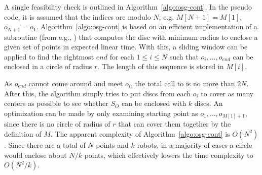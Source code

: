 A single feasibility check is outlined in Algorithm~\ref{algo:osg-cont}.
In the pseudo code, it is assumed that the indices are modulo $N$, e.g. 
$M[N+1] = M[1]$, $o_{N+1} = o_1$. 
%
Algorithm~\ref{algo:osg-cont} is based on an efficient implementation of 
a subroutine \algomed (from e.g., \cite{welzl1991smallest,
Mark1997computation}) that computes the disc with minimum radius to 
enclose a given set of points in expected linear time. With this, a sliding 
window can be applied to find the rightmost $end$ for each $1\leq i\leq 
N$ such that $o_i, \dots, o_{end}$ can be enclosed in a circle of radius 
$r$. The length of this sequence is stored in $M[i]$. 

As $o_{end}$ cannot come around and meet $o_i$, the total call to 
\algomed is no more than $2N$. After this, the algorithm simply tries to put 
discs from each $o_i$ to cover as many centers as possible to see 
whether $S_O$ can be enclosed with $k$ discs. An optimization can be made 
by only examining starting point as $o_1, \dots, o_{M[1]+1}$, since there 
is no circle of radius of $r$ that can cover them together by the 
definition of $M$.
%
The apparent complexity of Algorithm~\ref{algo:osg-cont} is $O(N^2)$. Since 
there are a total of $N$ points and $k$ robots, in a majority 
of cases a circle would enclose about $N/k$ points, which effectively 
lowers the time complexity to $O(N^2/k)$.

\def\algoptfeasi{\textsc{Opg\_2D\_Cont\_Feasible}}

